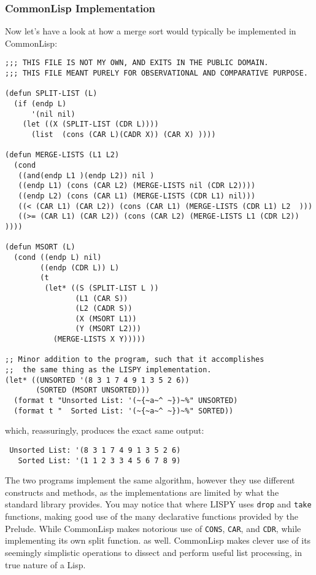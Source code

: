 \documentclass{article}
\newcommand{\code}[1]{\texttt{#1}}
\begin{document}
   \subsubsection{CommonLisp Implementation}
    Now let's have a look at how a merge sort would typically be implemented in
    CommonLisp:
    \begin{verbatim}
;;; THIS FILE IS NOT MY OWN, AND EXITS IN THE PUBLIC DOMAIN.
;;; THIS FILE MEANT PURELY FOR OBSERVATIONAL AND COMPARATIVE PURPOSE.

(defun SPLIT-LIST (L)
  (if (endp L)
      '(nil nil)
    (let ((X (SPLIT-LIST (CDR L))))
      (list  (cons (CAR L)(CADR X)) (CAR X) ))))

(defun MERGE-LISTS (L1 L2)
  (cond
   ((and(endp L1 )(endp L2)) nil )
   ((endp L1) (cons (CAR L2) (MERGE-LISTS nil (CDR L2))))
   ((endp L2) (cons (CAR L1) (MERGE-LISTS (CDR L1) nil)))
   ((< (CAR L1) (CAR L2)) (cons (CAR L1) (MERGE-LISTS (CDR L1) L2  )))
   ((>= (CAR L1) (CAR L2)) (cons (CAR L2) (MERGE-LISTS L1 (CDR L2))  ))))

(defun MSORT (L)
  (cond ((endp L) nil)
        ((endp (CDR L)) L)
        (t
         (let* ((S (SPLIT-LIST L ))
                (L1 (CAR S))
                (L2 (CADR S))
                (X (MSORT L1))
                (Y (MSORT L2)))
           (MERGE-LISTS X Y)))))

;; Minor addition to the program, such that it accomplishes
;;  the same thing as the LISPY implementation.
(let* ((UNSORTED '(8 3 1 7 4 9 1 3 5 2 6))
       (SORTED (MSORT UNSORTED)))
  (format t "Unsorted List: '(~{~a~^ ~})~%" UNSORTED)
  (format t "  Sorted List: '(~{~a~^ ~})~%" SORTED))
    \end{verbatim}
    which, reassuringly, produces the exact same output:
    \begin{Verbatim}
 Unsorted List: '(8 3 1 7 4 9 1 3 5 2 6)
   Sorted List: '(1 1 2 3 3 4 5 6 7 8 9)
    \end{Verbatim}

    \clearpage

    The two programs implement the same algorithm, however they use different
    constructs and methods, as the implementations are limited by what the
    standard library provides. You may notice that where LISPY uses \code{drop}
    and \code{take} functions, making good use of the many declarative functions
    provided by the Prelude. While CommonLisp makes notorious use of \code{CONS},
    \code{CAR}, and \code{CDR}, while implementing its own split function. as well.
    CommonLisp makes clever use of its seemingly simplistic operations to dissect
    and perform useful list processing, in true nature of a Lisp.
\end{document}
